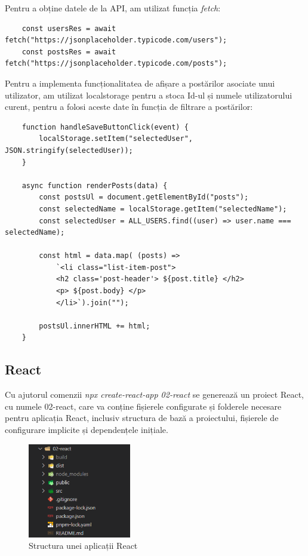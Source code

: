 \documentclass[12pt, a4paper]{report}
\begin{document}
Pentru a obține datele de la API, am utilizat funcția  \emph{fetch}:
\begin{lstlisting}
	const usersRes = await fetch("https://jsonplaceholder.typicode.com/users");
	const postsRes = await fetch("https://jsonplaceholder.typicode.com/posts");
\end{lstlisting}

Pentru a implementa funcționalitatea de afișare a post\u arilor asociate unui utilizator, am utilizat localstorage pentru a stoca Id-ul și numele utilizatorului curent, pentru a folosi aceste date în funcția de filtrare a post\u arilor:
\begin{lstlisting}
	function handleSaveButtonClick(event) {
		localStorage.setItem("selectedUser", JSON.stringify(selectedUser));
	}

	async function renderPosts(data) {
		const postsUl = document.getElementById("posts");
		const selectedName = localStorage.getItem("selectedName");
  		const selectedUser = ALL_USERS.find((user) => user.name === selectedName);

		const html = data.map( (posts) => 
			`<li class="list-item-post"> 
			<h2 class='post-header'> ${post.title} </h2>
			<p> ${post.body} </p>
			</li>`).join("");

	  	postsUl.innerHTML += html;
	}

\end{lstlisting}
\subsection{React}

Cu ajutorul comenzii \emph{npx create-react-app 02-react} se generează un proiect React, cu numele 02-react, care va conține fișierele configurate și folderele necesare pentru aplicația React, inclusiv structura de bază a proiectului, fișierele de configurare implicite și dependențele inițiale.

\begin{figure}[htbp]
	\centering
	\includegraphics[width=0.4\textwidth]{react_file_structure.png}
	\caption{Structura unei aplicații React}
	\label{fig:react-structure}
\end{figure}
\end{document}
